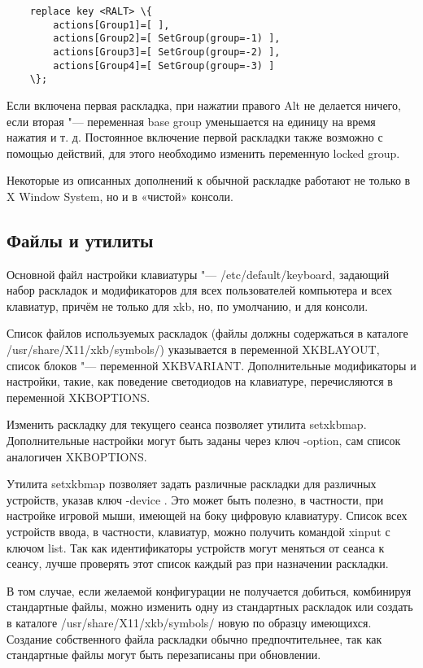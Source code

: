 \documentclass[10pt, a5paper]{article}
\begin{document}
\begin{verbatim}
    replace key <RALT> \{
        actions[Group1]=[ ],
        actions[Group2]=[ SetGroup(group=-1) ],
        actions[Group3]=[ SetGroup(group=-2) ],
        actions[Group4]=[ SetGroup(group=-3) ]
    \};
\end{verbatim}

Если включена первая раскладка, при нажатии правого Alt не делается ничего, если вторая "--- переменная base group уменьшается на единицу на время нажатия и т. д. Постоянное включение первой раскладки также возможно с помощью действий, для этого необходимо изменить переменную locked group. 

Некоторые из описанных дополнений к обычной раскладке работают не только в X Window System, но и в «чистой» консоли.

\subsection*{Файлы и утилиты}

Основной файл настройки клавиатуры "--- /etc/default/keyboard, задающий набор раскладок и модификаторов для всех пользователей компьютера и всех клавиатур, причём не только для xkb, но, по умолчанию, и для консоли.

Список файлов используемых раскладок (файлы должны содержаться в каталоге /usr/share/X11/xkb/symbols/) указывается в переменной \linebreak XKBLAYOUT, список блоков "--- переменной XKBVARIANT. Дополнительные модификаторы и настройки, такие, как поведение светодиодов на клавиатуре, перечисляются в переменной XKBOPTIONS.

Изменить раскладку для текущего сеанса позволяет утилита setxkbmap. Дополнительные настройки могут быть заданы через ключ -option, сам список аналогичен XKBOPTIONS.

Утилита setxkbmap позволяет задать различные раскладки для различных устройств, указав ключ -device \footnotemark[2]. Это может быть полезно, в частности, при настройке игровой мыши, имеющей на боку цифровую клавиатуру. Список всех устройств ввода, в частности, клавиатур, можно получить командой  xinput с ключом list. Так как идентификаторы устройств могут меняться от сеанса к сеансу, лучше проверять этот список каждый раз при назначении раскладки.

В том случае, если желаемой конфигурации не получается добиться, комбинируя стандартные файлы, можно изменить одну из стандартных раскладок или создать в каталоге \linebreak /usr/share/X11/xkb/symbols/ новую по образцу имеющихся. Создание собственного файла раскладки обычно предпочтительнее, так как стандартные файлы могут быть перезаписаны при обновлении.
\end{document}
